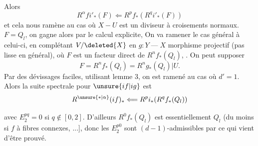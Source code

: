 
Alors
\[
R^\alpha fi'_*(F)\Longleftarrow R^pf_*(R^qi'_*(F))
\]
et cela nous ramène  au cas où
\(X-U\) est un diviseur à croisements normaux.
 \(F=Q_l\), on gagne alors par le calcul explicite,
On va ramener le cas général à celui-ci, en complétant \(V/\deleted{X}\) en
\(g:Y\mathbin{\text{---}}X\) morphisme projectif (pas lisse en général),
où \(F\) est un facteur direct de \(R^nf_*(Q_l)\),
.
On peut supposer
\[
F=R^nf_*(Q_l)=R^ng_*(Q_l)|U.
\]
Par des dévissages faciles, utilisant lemme 3,
on est ramené au cas où \(d'=1\).
Alors la suite spectrale pour \(\unsure{if|ig}\) est
\[
R^{\unsure{*|\alpha}}(if)_*\Longleftarrow R^pi_*(R^qf_*(Q_l))
\]

avec \(E_2^{pq}=0\) si \(q\notin[0,2]\).
D'ailleurs \(R^0f_*(Q_l)\) est essentiellement \(Q_l\)
(du moins si \(f\) à fibres connexes, 
...],
donc les  \(E_2^{p0}\) sont
\((d-1)\)-admissibles par  ce qui vient d'être prouvé.

